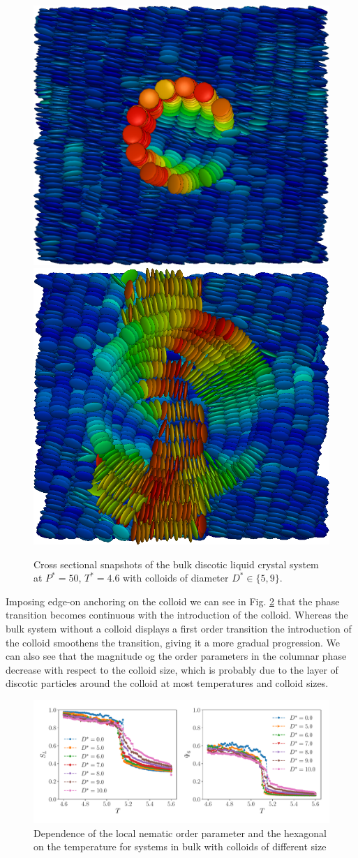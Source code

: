 \begin{figure}[H]
 \centering
 \includegraphics[width=.4\linewidth]{images/beo_C32_D5.png}
 \qquad
 \includegraphics[width=.4\linewidth]{images/beo_C32_D9.png}
\caption{Cross sectional snapshots of the bulk discotic liquid crystal system at $P^* = 50$, $T^* = 4.6$ with colloids of diameter $D^* \in \{5,9\} $.}
 \label{fig:beosnapshots}
\end{figure}


Imposing edge-on anchoring on the colloid we can see in Fig. \ref{fig:beoc32lochex} that the phase transition becomes continuous with the introduction of the colloid. Whereas the bulk system without a colloid displays a first order transition the introduction of the colloid smoothens the transition, giving it a more gradual progression. We can also see that the magnitude og the order parameters in the columnar phase decrease with respect to the colloid size, which is probably due to the layer of discotic particles around the colloid at most temperatures and colloid sizes.
\begin{figure}[H]
    \centering
	\includegraphics[width=\linewidth]{plots/beo_c32_lochex.pdf}
	\caption{Dependence of the local nematic order parameter and the hexagonal on the temperature for systems in bulk with colloids of different size}
    \label{fig:beoc32lochex}
\end{figure}


